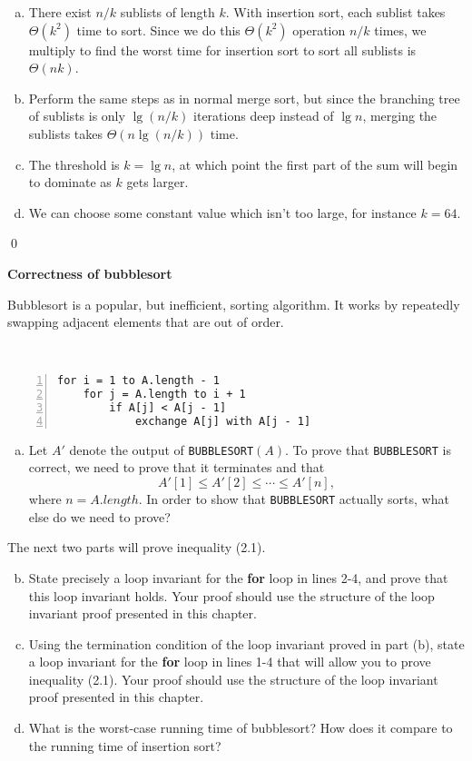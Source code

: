 \sol \begin{enumerate}[(a)]
    \item There exist $n/k$ sublists of length $k$. With insertion sort, each sublist takes $\Theta(k^2)$ time to sort. Since we do this $\Theta(k^2)$ operation $n/k$ times, we multiply to find the worst time for insertion sort to sort all sublists is $\Theta(nk)$.
    \item Perform the same steps as in normal merge sort, but since the branching tree of sublists is only $\lg (n/k)$ iterations deep instead of $ \lg n$, merging the sublists takes $\Theta(n \lg (n/k))$ time.
    \item The threshold is $k = \lg n$, at which point the first part of the sum will begin to dominate as $k$ gets larger.
    \item We can choose some constant value which isn't too large, for instance $k=64$.
\end{enumerate}\qed

 \textbf{Correctness of bubblesort}

Bubblesort is a popular, but inefficient, sorting algorithm. It works by repeatedly swapping adjacent elements that are out of order.

\,

\begin{Verbatim}[frame=single,numbers=left,samepage=true,label={BUBBLESORT(A)}]
for i = 1 to A.length - 1
    for j = A.length to i + 1
        if A[j] < A[j - 1]
            exchange A[j] with A[j - 1]
\end{Verbatim}

\begin{enumerate}[(a)]
    \item Let $A'$ denote the output of \verb|BUBBLESORT|$(A)$. To prove that \verb|BUBBLESORT| is correct, we need to prove that it terminates and that \begin{equation}A'[1] \leq A'[2] \leq \cdots \leq A'[n],\end{equation} where $n = A.length$. In order to show that \verb|BUBBLESORT| actually sorts, what else do we need to prove?
\end{enumerate}

The next two parts will prove inequality (2.1).

\begin{enumerate}[(a)]
    \setcounter{enumi}{1}
    \item State precisely a loop invariant for the \textbf{for} loop in lines 2-4, and prove that this loop invariant holds. Your proof should use the structure of the loop invariant proof presented in this chapter.
    \item Using the termination condition of the loop invariant proved in part (b), state a loop invariant for the \textbf{for} loop in lines 1-4 that will allow you to prove inequality (2.1). Your proof should use the structure of the loop invariant proof presented in this chapter.
    \item What is the worst-case running time of bubblesort? How does it compare to the running time of insertion sort?
\end{enumerate}

